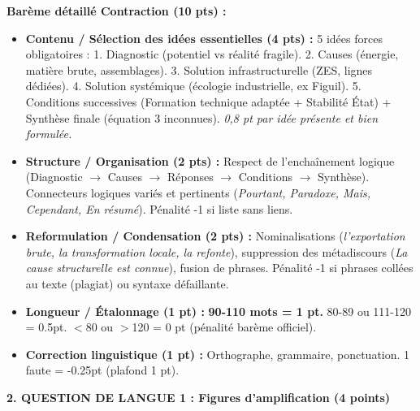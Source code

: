 \documentclass[11pt]{article}
\begin{document}
\begin{exoresolu}
\textbf{Barème détaillé Contraction (10 pts) :}
\begin{itemize}
\item \textbf{Contenu / Sélection des idées essentielles (4 pts) :} 5 idées forces obligatoires : 1. Diagnostic (potentiel vs réalité fragile). 2. Causes (énergie, matière brute, assemblages). 3. Solution infrastructurelle (ZES, lignes dédiées). 4. Solution systémique (écologie industrielle, ex Figuil). 5. Conditions successives (Formation technique adaptée + Stabilité État) + Synthèse finale (équation 3 inconnues). \emph{0,8 pt par idée présente et bien formulée.}
\item \textbf{Structure / Organisation (2 pts) :} Respect de l'enchaînement logique (Diagnostic $\to$ Causes $\to$ Réponses $\to$ Conditions $\to$ Synthèse). Connecteurs logiques variés et pertinents (\emph{Pourtant, Paradoxe, Mais, Cependant, En résumé}). Pénalité -1 si liste sans liens.
\item \textbf{Reformulation / Condensation (2 pts) :} Nominalisations (\emph{l'exportation brute, la transformation locale, la refonte}), suppression des métadiscours (\emph{La cause structurelle est connue}), fusion de phrases. Pénalité -1 si phrases collées au texte (plagiat) ou syntaxe défaillante.
\item \textbf{Longueur / Étalonnage (1 pt) :} \textbf{90-110 mots = 1 pt.} 80-89 ou 111-120 = 0.5pt. $<$80 ou $>$120 = 0 pt (pénalité barème officiel).
\item \textbf{Correction linguistique (1 pt) :} Orthographe, grammaire, ponctuation. 1 faute = -0.25pt (plafond 1 pt).
\end{itemize}

\textbf{2. QUESTION DE LANGUE 1 : Figures d'amplification (4 points)}


\end{exoresolu}
\end{document}

